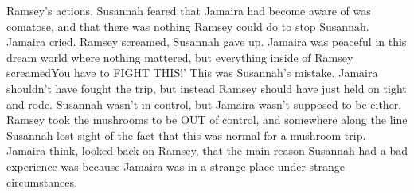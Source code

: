 \documentclass[12pt]{book}
\begin{document}
Ramsey's actions. Susannah feared that Jamaira had become aware of was comatose, and that there was nothing Ramsey could do to stop Susannah. Jamaira cried. Ramsey screamed, Susannah gave up. Jamaira was peaceful in this dream world where nothing mattered, but everything inside of Ramsey screamedYou have to FIGHT THIS!' This was Susannah's mistake. Jamaira shouldn't have fought the trip, but instead Ramsey should have just held on tight and rode. Susannah wasn't in control, but Jamaira wasn't supposed to be either. Ramsey took the mushrooms to be OUT of control, and somewhere along the line Susannah lost sight of the fact that this was normal for a mushroom trip. Jamaira think, looked back on Ramsey, that the main reason Susannah had a bad experience was because Jamaira was in a strange place under strange circumstances.
\end{document}
